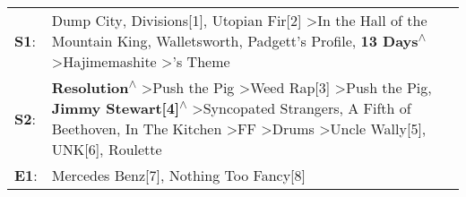 \begin{supertabular}{p{0.03\textwidth}p{0.92\textwidth}}
 \textbf{S1}:  &                                                                                                                                                                                                               Dump City\textsuperscript{}, \enspace Divisions[1]\textsuperscript{}, \enspace Utopian Fir[2]\textsuperscript{} \textgreater \enspace In the Hall of the Mountain King\textsuperscript{}, \enspace Walletsworth\textsuperscript{}, \enspace Padgett's Profile\textsuperscript{}, \enspace \textbf{13 Days\textsuperscript{$\wedge$}} \textgreater \enspace Hajimemashite\textsuperscript{} \textgreater {}'s Theme\textsuperscript{}  \enspace  \\
 \textbf{S2}:  &  \textbf{Resolution\textsuperscript{$\wedge$}} \textgreater \enspace Push the Pig\textsuperscript{} \textgreater \enspace Weed Rap[3]\textsuperscript{} \textgreater \enspace Push the Pig\textsuperscript{}, \enspace \textbf{Jimmy Stewart[4]\textsuperscript{$\wedge$}} \textgreater \enspace Syncopated Strangers\textsuperscript{}, \enspace A Fifth of Beethoven\textsuperscript{}, \enspace In The Kitchen\textsuperscript{} \textgreater \enspace FF\textsuperscript{} \textgreater \enspace Drums\textsuperscript{} \textgreater \enspace Uncle Wally[5]\textsuperscript{}, \enspace UNK[6]\textsuperscript{}, \enspace Roulette\textsuperscript{}  \enspace  \\
 \textbf{E1}:  &                                                                                                                                                                                                                                                                                                                                                                                                                                                                                                                                                                         Mercedes Benz[7]\textsuperscript{}, \enspace Nothing Too Fancy[8]\textsuperscript{}  \enspace  \\
\end{supertabular}

